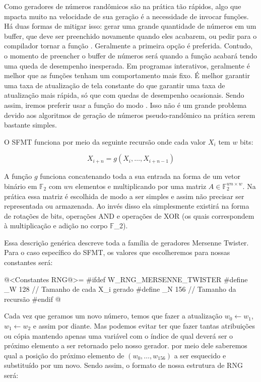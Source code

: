 Como geradores de números randômicos são na prática tão rápidos, algo
que mpacta muito na velocidade de sua geração é a necessidade de
invocar funções. Há duas formas de mitigar isso: gerar uma grande
quantidade de números em um buffer, que deve ser preenchido novamente
quando eles acabarem, ou pedir para o compilador tornar a
função . Geralmente a primeira opção é
preferida. Contudo, o momento de preencher o buffer de números será
quando a função acabará tendo uma queda de desempenho inesperada. Em
programas interativos, geralmente é melhor que as funções tenham um
comportamento mais fixo. É melhor garantir uma taxa de atualização de
tela constante do que garantir uma taxa de atualização mais rápida, só
que com quedas de desempenho ocasionais. Sendo assim, iremos preferir
usar a função do modo . Isso não é um grande
problema devido aos algoritmos de geração de números pseudo-randômico
na prática serem bastante simples.

O SFMT funciona por meio da seguinte recursão onde cada valor $X_i$ tem
$w$ bits:

$$
X_{i+n}=g(X_i, \ldots, X_{i+n-1})
$$

A função $g$ funciona concatenando toda a sua entrada na forma de um
vetor binário em $\mathbb{F}_2$ com $wn$ elementos e multiplicando por
uma matriz $A\in\mathbb{F}_2^{wn\times w}$. Na prática essa matriz é
escolhida de modo a ser simples e assim não precisar ser representada
ou armazenada. Ao invés disso ela simplesmente existirá na forma de
rotações de bits, operações AND e operações de XOR (os quais
correspondem à multiplicação e adição no corpo $\mathbb{F}$_2).

Essa descrição genérica descreve toda a família de geradores Mersenne
Twister. Para o caso específico do SFMT, os valores que escolheremos
para nossas constantes será:

\iniciocodigo
@<Constantes RNG@>=
#ifdef W_RNG_MERSENNE_TWISTER
#define _W 128 // Tamanho de cada X_i gerado
#define _N 156 // Tamanho da recursão
#endif
@
\fimcodigo

Cada vez que geramos um novo número, temos que fazer a atualização
$w_0 \leftarrow w_1$, $w_1 \leftarrow w_2$ e assim por diante. Mas
podemos evitar ter que fazer tantas atribuições ou cópia mantendo
apenas uma variável com o índice de qual deverá ser o próximo elemento
a ser retornado pelo nosso gerador. por meio dele saberemos qual a
posição do próximo elemento de $(w_0, \ldots, w_{156})$ a ser
esquecido e substituído por um novo. Sendo assim, o formato de nossa
estrutura de RNG será:

